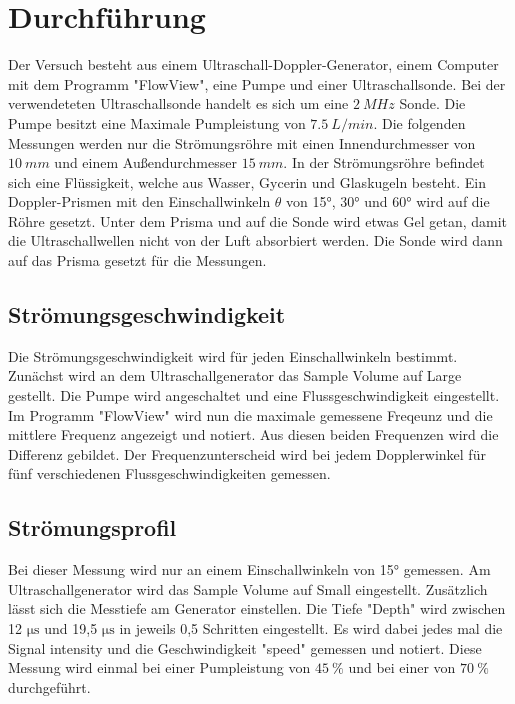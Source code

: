 \section{Durchführung}
\label{sec:Durchführung}
Der Versuch besteht aus einem Ultraschall-Doppler-Generator, einem Computer mit dem Programm "FlowView", eine Pumpe und einer Ultraschallsonde. 
Bei der verwendeteten Ultraschallsonde handelt es sich um eine $\qty{2}{MHz}$ Sonde.
Die Pumpe besitzt eine Maximale Pumpleistung von $\qty{7.5}{L/min}$.
Die folgenden Messungen werden nur die Strömungsröhre mit einen Innendurchmesser von $\qty{10}{mm}$ und einem Außendurchmesser $\qty{15}{mm}$.
In der Strömungsröhre befindet sich eine Flüssigkeit, welche aus Wasser, Gycerin und Glaskugeln besteht.
Ein Doppler-Prismen mit den Einschallwinkeln $\theta $ von 15°, 30° und 60° wird auf die Röhre gesetzt.
Unter dem Prisma und auf die Sonde wird etwas Gel getan, damit die Ultraschallwellen nicht von der Luft absorbiert werden.
Die Sonde wird dann auf das Prisma gesetzt für die Messungen.

\subsection{Strömungsgeschwindigkeit}
Die Strömungsgeschwindigkeit wird für jeden Einschallwinkeln bestimmt.
Zunächst wird an dem Ultraschallgenerator das Sample Volume auf Large gestellt.
Die Pumpe wird angeschaltet und eine Flussgeschwindigkeit eingestellt.
Im Programm "FlowView" wird nun die maximale gemessene Freqeunz und die mittlere Frequenz angezeigt und notiert.
Aus diesen beiden Frequenzen wird die Differenz gebildet.
Der Frequenzunterscheid wird bei jedem Dopplerwinkel für fünf verschiedenen Flussgeschwindigkeiten gemessen.

\subsection{Strömungsprofil}
Bei dieser Messung wird nur an einem Einschallwinkeln von 15° gemessen.
Am Ultraschallgenerator wird das Sample Volume auf Small eingestellt.
Zusätzlich lässt sich die Messtiefe am Generator einstellen.
Die Tiefe "Depth" wird zwischen 12 $\unit{\micro\s}$ und 19,5 $\unit{\micro\s}$ in jeweils 0,5 Schritten eingestellt.
Es wird dabei jedes mal die Signal intensity und die Geschwindigkeit "speed" gemessen und notiert.
Diese Messung wird einmal bei einer Pumpleistung von $\qty{45}{\%}$ und bei einer von $\qty{70}{\%}$ durchgeführt.